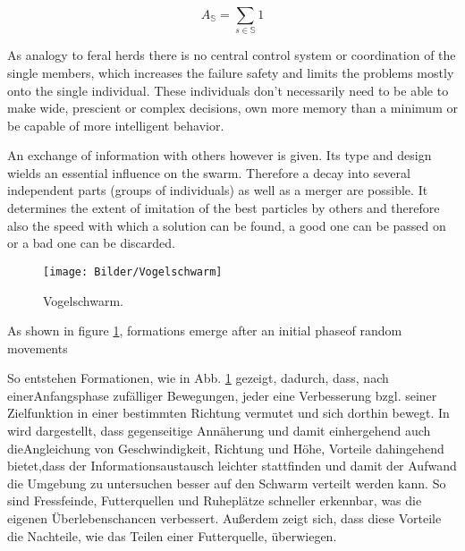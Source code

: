   \begin{equation}
    A_\mathbb{S} = \sum\limits_{s\in\mathbb{S}}1
  \end{equation}

  \noindent As analogy to feral herds there is no central control system or \linebreak coordination of the single members, which increases the failure safety \linebreak and limits the problems mostly onto the single individual. These individuals don't necessarily need to be able to make wide, prescient or complex decisions, own more memory than a minimum or be capable of more intelligent behavior. \cite{Eberhart2001, DMap2004}
  
  An exchange of information with others however is given. Its type and design wields an essential influence on the swarm. Therefore a decay into several independent parts (groups of individuals) as well as a merger are possible. It determines the extent of imitation of the best particles by others and therefore also the speed with which a solution can be found, a good one can be passed on or a bad one can be discarded. 
  \begin{figure}[!t]
    \centering
    \texttt{[image: Bilder/Vogelschwarm]}
    \caption{Vogelschwarm. \cite{Vogel08}}
    \label{Vogelschwarm}
  \end{figure}

  As shown in figure \ref{Vogelschwarm}, formations emerge after an initial phase\linebreak of random movements 
  
  So entstehen Formationen, wie in Abb. \ref{Vogelschwarm} gezeigt, dadurch, dass, nach einer\linebreak Anfangsphase zufälliger Bewegungen, jeder eine Verbesserung bzgl. seiner Ziel\-funktion in einer bestimmten Richtung vermutet und sich dorthin bewegt. In \cite{Eberhart2001} wird dargestellt, dass gegenseitige Annäherung und damit einhergehend auch die\linebreak Angleichung von Geschwindigkeit, Richtung und Höhe, Vorteile dahingehend bietet,\linebreak dass der Informationsaustausch leichter stattfinden und damit der Aufwand die Umgebung zu untersuchen besser auf den Schwarm verteilt werden kann. So sind Fressfeinde, Futterquellen und Ruheplätze schneller erkennbar, was die eigenen Überlebenschancen verbessert. Außerdem zeigt sich, dass diese Vorteile die Nachteile, wie das Teilen einer Futterquelle, überwiegen.
  
